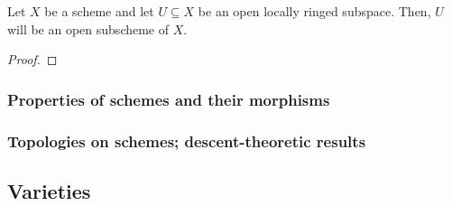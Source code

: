             \begin{proposition} \label{prop: open_subschemes_are_open_locally_ringed_subspaces}
                Let $X$ be a scheme and let $U \subseteq X$ be an open locally ringed subspace. Then, $U$ will be an open subscheme of $X$. 
            \end{proposition}
                \begin{proof}
                    
                \end{proof}
            \begin{corollary} \label{coro: zariski_bases_of_schemes}
                
            \end{corollary}
    
        \subsubsection{Properties of schemes and their morphisms}
        
        \subsubsection{Topologies on schemes; descent-theoretic results}
    
    \subsection{Varieties}